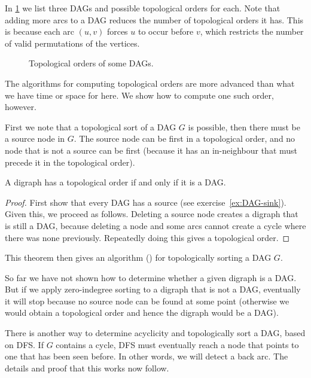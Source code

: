 \begin{Example}
\label{eg:toporder}
In \cref{fig:toporder} we list three DAGs and possible topological
orders for each. Note that adding more arcs to a DAG  reduces the number
of topological orders it has.  This is because each arc $(u,v)$ forces
$u$ to occur before $v$, which restricts the number of valid permutations
of the vertices.
\end{Example}

\begin{figure}
\centerline{}

\caption{Topological orders of some DAGs.}
\label{fig:toporder}
\end{figure}

The algorithms for computing  topological orders are
more advanced than what we have time or space for here. We show how to
compute one such order, however.

First we note that  a topological sort of a DAG $G$
is possible, then there must be a source node in $G$. The source
node can be first in a topological order, and no node that is not
a source can be first (because it has an in-neighbour that must
precede it in the topological order).


\begin{Theorem}
\label{thm:topDAG}
A digraph has a topological order if and only if it is a DAG.
\end{Theorem}

\begin{proof} 
First show that every DAG has a source (see
exercise~\ref{ex:DAG-sink}).  Given this, we proceed as follows. Deleting
a source node creates a digraph that is still a DAG, because deleting
a node and some arcs cannot create a cycle where there was none
previously. Repeatedly doing this gives a topological order.
\end{proof}

This theorem then gives an algorithm ()
for topologically sorting a DAG $G$.

So far we have not shown how to determine whether a given digraph is
a DAG. But if we apply zero-indegree sorting to a digraph that is not
a DAG, eventually it will stop because no source node can be found at
some point (otherwise we would obtain a topological order and hence the
digraph would be a DAG).

There is another way to determine acyclicity and topologically sort a
DAG, based on DFS. If $G$ contains a cycle,  DFS must eventually reach
a node that points to one that has been seen before. In other words, we
will detect a back arc. The details and proof that this works now follow.

